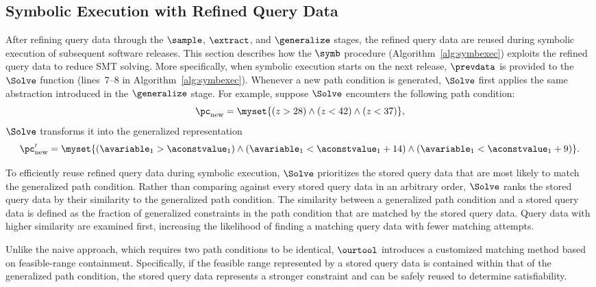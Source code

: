 \subsection{Symbolic Execution with Refined Query Data}
\label{sec:compare}
After refining query data through the $\sample$, $\extract$, and $\generalize$ stages, the refined query data are reused during symbolic execution of subsequent software releases. This section describes how the $\symb$ procedure (Algorithm~\ref{alg:symbexec}) exploits the refined query data to reduce SMT solving. More specifically, when symbolic execution starts on the next release, $\prevdata$ is provided to the $\Solve$ function (lines~7--8 in Algorithm~\ref{alg:symbexec}). Whenever a new path condition is generated, $\Solve$ first applies the same abstraction introduced in the $\generalize$ stage. For example, suppose $\Solve$ encounters the following path condition:
\[
\pc_{\text{new}}
=
\myset{
(z>28)\land(z<42)\land(z<37)
},
\]
$\Solve$ transforms it into the generalized representation
\[
\pc'_{\text{new}}
=
\myset{
(\avariable_1>\aconstvalue_1)
\land
(\avariable_1<\aconstvalue_1+14)
\land
(\avariable_1<\aconstvalue_1+9)
}.
\]

To efficiently reuse refined query data during symbolic execution, $\Solve$ prioritizes the stored query data that are most likely to match the generalized path condition. Rather than comparing against every stored query data in an arbitrary order, $\Solve$ ranks the stored query data by their similarity to the generalized path condition. The similarity between a generalized path condition and a stored query data is defined as the fraction of generalized constraints in the path condition that are matched by the stored query data. Query data with higher similarity are examined first, increasing the likelihood of finding a matching query data with fewer matching attempts.

Unlike the naive approach, which requires two path conditions to be identical, $\ourtool$ introduces a customized matching method based on feasible-range containment. Specifically, if the feasible range represented by a stored query data is contained within that of the generalized path condition, the stored query data represents a stronger constraint and can be safely reused to determine satisfiability.

